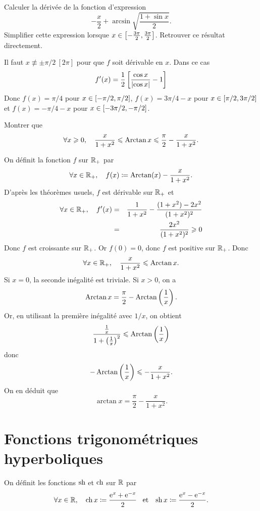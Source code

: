 \documentclass{magnolia}
\begin{document}
\begin{exos}
\exemple Calculer la dérivée de la fonction d'expression
  \[-\frac{x}{2}+\arcsin\sqrt{\frac{1+\sin x}{2}}.\]
  Simplifier cette expression lorsque
  $x\in\left[-\frac{3\pi}{2},\frac{3\pi}{2}\right]$. Retrouver ce résultat
  directement.
  \begin{sol}
  Il faut $x\not\equiv\pm\pi/2\ [2\pi]$ pour que $f$ soit dérivable en $x$. Dans
  ce cas
  \[f'(x)=\frac{1}{2}\left[\frac{\cos x}{\left|\cos x\right|}-1\right]\]
  Donc $f(x)=\pi/4$ pour $x\in\left[-\pi/2,\pi/2\right]$, $f(x)=3\pi/4-x$
  pour $x\in\left[\pi/2,3\pi/2\right]$ et $f(x)=-\pi/4-x$ pour
  $x\in\left[-3\pi/2,-\pi/2\right]$.
  \end{sol}
\exemple Montrer que
  \[\forall x\geqslant 0 ,\quad
    \frac{x}{1+x^2}\leqslant\operatorname{Arctan} x\leqslant\frac{\pi}{2}-\frac{x}{1+x^2}.\]
  \begin{sol}
  On définit la fonction $f$ sur $\mathbb{R}_+$ par
  \[\forall x\in\mathbb{R}_+,\quad f(x)\coloneqq \operatorname{Arctan}(x)-\frac{x}{1+x^2}.\]
  D'après les théorèmes usuels, $f$ est dérivable sur $\mathbb{R}_+$ et
  \begin{eqnarray*}
  \forall x\in\mathbb{R}_+,\quad f'(x)
  &=& \frac{1}{1+x^2}-\frac{(1+x^2)-2x^2}{(1+x^2)^2}\\
  &=& \frac{2x^2}{(1+x^2)^2}\geqslant 0
  \end{eqnarray*}
  Donc $f$ est croissante sur $\mathbb{R}_+$. Or $f(0)=0$, donc $f$ est positive sur $\mathbb{R}_+$. Donc
  \[\forall x\in\mathbb{R}_+,\quad \frac{x}{1+x^2}\leqslant\operatorname{Arctan} x.\]
  Si $x=0$, la seconde inégalité est triviale. Si $x>0$, on a
  \[\operatorname{Arctan} x =\frac{\pi}{2}-\operatorname{Arctan}\left(\frac{1}{x}\right).\]
  Or, en utilisant la première inégalité avec $1/x$, on obtient
  \[\frac{\frac{1}{x}}{1+\left(\frac{1}{x}\right)^2}\leqslant\operatorname{Arctan}\left(\frac{1}{x}\right)\]
  donc
  \[-\operatorname{Arctan}\left(\frac{1}{x}\right)\leqslant -\frac{x}{1+x^2}.\]
  On en déduit que
  \[\arctan x =\frac{\pi}{2}-\frac{x}{1+x^2}.\]
  \end{sol}
\end{exos}

\section{Fonctions trigonométriques hyperboliques}

\begin{definition}[utile=-3]
On définit les fonctions $\operatorname{sh}$ et $\operatorname{ch}$ sur $\mathbb{R}$ par
\[\forall x\in\mathbb{R} ,\quad \operatorname{ch} x\coloneqq\frac{{\rm e}^x+{\rm e}^{-x}}{2} \quad\!\text{et}\quad\!
                       \operatorname{sh} x\coloneqq\frac{{\rm e}^x-{\rm e}^{-x}}{2}.\]
\end{definition}
\end{document}
